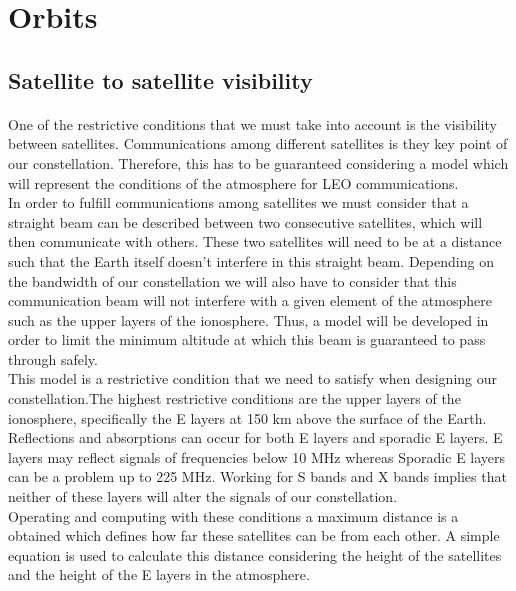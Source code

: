 \documentclass{article}
\begin{document}
\section{Orbits}

\subsection{Satellite to satellite visibility}
\paragraph{ }

One of the restrictive conditions that we must take into account is the visibility between satellites. Communications among different satellites is they key point of our constellation. Therefore, this has to be guaranteed considering a model which will represent the conditions of the atmosphere for LEO communications. \\

In order to fulfill communications among satellites we must consider that a straight beam can be described between two consecutive satellites, which will then communicate with others. These two satellites will need to be at a distance such that the Earth itself doesn't interfere in this straight beam. Depending on the bandwidth of our constellation we will also have to consider that this communication beam will not interfere with a given element of the atmosphere such as the upper layers of the ionosphere. Thus, a model will be developed in order to limit the minimum altitude at which this beam is guaranteed to pass through safely. \\

This model is a restrictive condition that we need to satisfy when designing our constellation.The highest restrictive conditions are the upper layers of the ionosphere, specifically the E layers at 150 km above the surface of the Earth. Reflections and absorptions can occur for both E layers and sporadic E layers. E layers may reflect signals of frequencies below 10 MHz whereas Sporadic E layers can be a problem up to 225 MHz. Working for S bands and X bands implies that neither of these layers will alter the signals of our constellation. \\

Operating and computing with these conditions a maximum distance is a obtained which defines how far these satellites can be from each other. A simple equation is used to calculate this distance considering the height of the satellites and the height of the E layers in the atmosphere. \\
\end{document}
